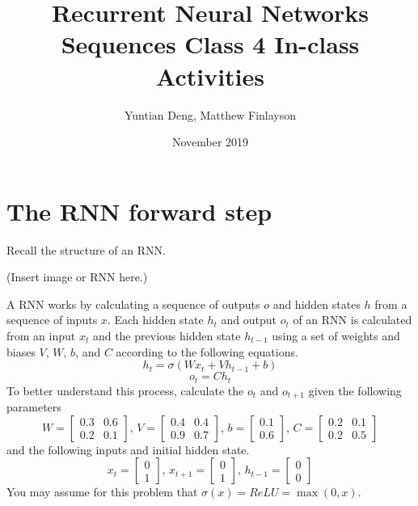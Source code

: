 \documentclass{article}
\title{Recurrent Neural Networks \\
\large Sequences Class 4 In-class Activities}
\author{Yuntian Deng, Matthew Finlayson}
\date{November 2019}
\begin{document}
\maketitle

\section{The RNN forward step}
Recall the structure of an RNN.

(Insert image or RNN here.)

A RNN works by calculating a sequence of outputs $o$ and hidden states $h$ from a sequence of inputs $x$. Each hidden state $h_t$ and output $o_t$ of an RNN is calculated from an input $x_{t}$ and the previous hidden state $h_{t - 1}$ using a set of weights and biases $V$, $W$, $b$, and $C$ according to the following equations.
$$ h_t = \sigma(Wx_t + Vh_{t - 1} + b) $$
$$ o_t = Ch_t $$
To better understand this process, calculate the $o_t$ and $o_{t + 1}$ given the following parameters
$$W = \begin{bmatrix} 0.3 & 0.6 \\ 0.2  & 0.1 \end{bmatrix},\, V = \begin{bmatrix}0.4 & 0.4 \\ 0.9  & 0.7 \end{bmatrix},\, b = \begin{bmatrix} 0.1 \\ 0.6 \end{bmatrix},\, C = \begin{bmatrix} 0.2 & 0.1 \\ 0.2  & 0.5 \end{bmatrix}$$
and the following inputs and initial hidden state.
$$x_t = \begin{bmatrix} 0 \\ 1 \end{bmatrix},\, x_{t + 1} = \begin{bmatrix} 0 \\ 1 \end{bmatrix},\, h_{t - 1} = \begin{bmatrix} 0 \\ 0 \end{bmatrix}$$
You may assume for this problem that $\sigma(x) = ReLU = \max(0, x)$.
\end{document}
